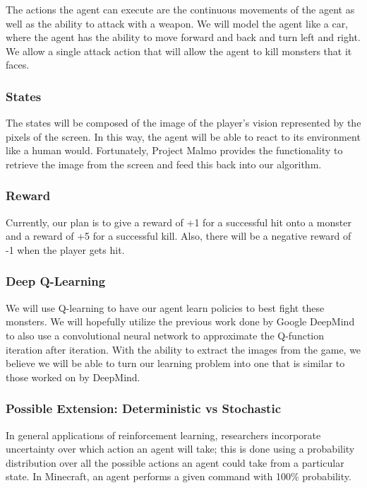 \documentclass{article}
\begin{document}
The actions the agent can execute are the continuous movements of the agent as well as the ability to attack with a weapon. We will model the agent like a car, where the agent has the ability to move forward and back and turn left and right. We allow a single attack action that will allow the agent to kill monsters that it faces.

\subsubsection{States}

The states will be composed of the image of the player's vision represented by the pixels of the screen. In this way, the agent will be able to react to its environment like a human would. Fortunately, Project Malmo provides the functionality to retrieve the image from the screen and  feed this back into our algorithm.

\subsubsection{ Reward}

Currently, our plan is to give a reward of +1 for a successful hit onto a monster and a reward of +5 for a successful kill. Also, there will be a negative reward of -1 when the player gets hit.

\subsubsection{Deep Q-Learning}

We will use Q-learning to have our agent learn policies to best fight these monsters. We will hopefully utilize the previous work done by Google DeepMind to also use a convolutional neural network to approximate the Q-function iteration after iteration.  With the ability to  extract the images from the game, we believe we will be able to turn our learning problem into one that is similar to those worked on by DeepMind.

\subsubsection{Possible Extension: Deterministic vs Stochastic}

In general applications of reinforcement learning, researchers incorporate uncertainty over which action an agent will take; this is done using a probability distribution over all the possible actions an agent could take from a particular state. In Minecraft, an agent performs a given command with 100\% probability.
\end{document}
